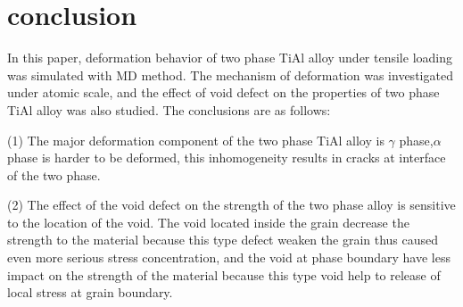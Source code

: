 \documentclass[metals,article,submit,moreauthors,pdftex,10pt,a4paper]{Definitions/mdpi}
\begin{document}
\section{conclusion}
In this paper, deformation behavior of two phase TiAl alloy under tensile loading was simulated with MD method. The mechanism of deformation was investigated under atomic scale, and the effect of void defect on the properties of two phase TiAl alloy was also studied.  The conclusions are as follows:

(1) The major deformation component of the two phase TiAl alloy is $\gamma$ phase,$\alpha$ phase is harder to be deformed, this inhomogeneity results in cracks at interface of the two phase. 

(2) The effect of the void defect on the strength of the two phase alloy is sensitive to the location of the void. The void located inside the grain decrease the strength to the material because this type defect weaken the grain thus caused even more serious stress concentration, and the void at phase boundary have less impact on the strength of the material because this type void help to release of local stress at grain boundary.



\end{document}
